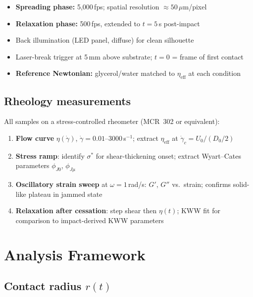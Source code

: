 \documentclass[11pt,letterpaper]{article}
\newcommand{\phiJz}{\phi_{J0}}
\newcommand{\phiJmu}{\phi_{J\mu}}
\newcommand{\etaeff}{\eta_{\mathrm{eff}}}
\newcommand{\gamcrit}{\dot{\gamma}_c}
\newcommand{\sigstar}{\sigma^*}
\begin{document}
\begin{itemize}[noitemsep,topsep=3pt]
  \item \textbf{Spreading phase:} 5,000\,fps; spatial resolution ${\approx}50\,\mu$m/pixel
  \item \textbf{Relaxation phase:} 500\,fps, extended to $t = 5$\,s post-impact
  \item Back illumination (LED panel, diffuse) for clean silhouette
  \item Laser-break trigger at 5\,mm above substrate; $t=0$ = frame of first contact
  \item \textbf{Reference Newtonian:} glycerol/water matched to $\etaeff$ at each condition
\end{itemize}

\subsection{Rheology measurements}

All samples on a stress-controlled rheometer (MCR~302 or equivalent):

\begin{enumerate}[noitemsep,topsep=3pt]
  \item \textbf{Flow curve} $\eta(\dot\gamma)$, $\dot\gamma = 0.01$--$3000$\,s$^{-1}$;
        extract $\etaeff$ at $\gamcrit = U_0/(D_0/2)$
  \item \textbf{Stress ramp}: identify $\sigstar$ for shear-thickening onset;
        extract Wyart--Cates parameters $\phiJz$, $\phiJmu$ \cite{WyartCates2014}
  \item \textbf{Oscillatory strain sweep} at $\omega = 1$\,rad/s: $G'$, $G''$ vs.\ strain;
        confirms solid-like plateau in jammed state
  \item \textbf{Relaxation after cessation}: step shear then $\eta(t)$; KWW fit for
        comparison to impact-derived KWW parameters
\end{enumerate}

\section{Analysis Framework}

\subsection{Contact radius $r(t)$}
\end{document}
